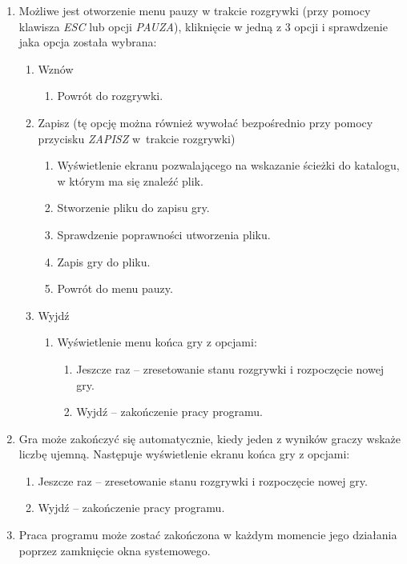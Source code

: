 \documentclass[a4paper]{article}
\begin{document}
\begin{enumerate}
    \item Możliwe jest otworzenie menu pauzy w trakcie rozgrywki (przy pomocy klawisza \textit{ESC} lub opcji \textit{PAUZA}), kliknięcie w jedną z 3 opcji i sprawdzenie jaka opcja została wybrana:\label{pauza}
    \begin{enumerate}
            \item Wznów
            \begin{enumerate}
                \item Powrót do rozgrywki.
            \end{enumerate}			
            \item Zapisz (tę opcję można również wywołać bezpośrednio przy pomocy przycisku \textit{ZAPISZ} w~trakcie rozgrywki)
            \begin{enumerate}
                \item Wyświetlenie ekranu pozwalającego na wskazanie ścieżki do katalogu, w którym ma się znaleźć plik.
                \item Stworzenie pliku do zapisu gry.
                \item Sprawdzenie poprawności utworzenia pliku.
                \item Zapis gry do pliku.
                \item Powrót do menu pauzy.
            \end{enumerate}			
            \item Wyjdź
            \begin{enumerate}			
                \item Wyświetlenie menu końca gry z opcjami:		
                \begin{enumerate}
					\item Jeszcze raz -- zresetowanie stanu rozgrywki i rozpoczęcie nowej gry.
					\item Wyjdź -- zakończenie pracy programu.
				\end{enumerate}
            \end{enumerate}		
    \end{enumerate}
    \item Gra może zakończyć się automatycznie, kiedy jeden z wyników graczy wskaże liczbę ujemną. Następuje wyświetlenie ekranu końca gry z opcjami:
    \begin{enumerate}
        \item Jeszcze raz -- zresetowanie stanu rozgrywki i rozpoczęcie nowej gry.
        \item Wyjdź -- zakończenie pracy programu.
    \end{enumerate}
    \item Praca programu może zostać zakończona w każdym momencie jego działania poprzez zamknięcie okna systemowego.
\end{enumerate}
\end{document}
